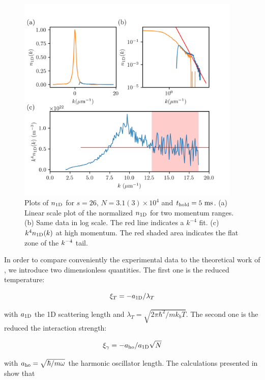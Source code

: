 \begin{figure}
    \centering
    \includegraphics[width=0.95\textwidth]{Fig/Chapter5/1D_plots.png}
    \caption{Plots of $n_{\rm{1D}}$ for $s=26$, $N=3.1(3) \times 10^4$ and $t_{\rm{hold}}=5 \ \rm{ms}$. (a) Linear scale plot of the normalized $n_{\rm{1D}}$ for two momentum ranges. (b) Same data in log scale. The red line indicates a $k^{-4}$ fit. (c) $k^4 n_{\rm{1D}} (k)$ at high momentum. The red shaded area indicates the flat zone of the $k^{-4}$ tail.}
    \label{fig:1D_plots}
\end{figure}

In order to compare conveniently the experimental data to the theoretical work of \cite{yao2018tan}, we introduce two dimensionless quantities. The first one is the reduced temperature:

\begin{equation}
    \xi_T=-a_{\rm{1D}}/\lambda_T
\end{equation}

\noindent with $a_{\rm{1D}}$ the 1D scattering length and $\lambda_T=\sqrt{2\pi \hbar^2/m k_b T}$. The second one is the reduced the interaction strength:

\begin{equation}
    \xi_{\gamma}=-a_{\rm{ho}}/a_{\rm{1D}}\sqrt{N}
\end{equation}

\noindent with $a_{\rm{ho}}=\sqrt{\hbar/m \omega}$ the harmonic oscillator length. The calculations presented in \cite{yao2018tan} show that 

